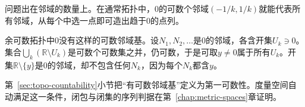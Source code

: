 问题出在邻域的数量上。在通常拓扑中，$0$的可数个邻域$(-1/k,1/k)$就能代表所有邻域，从每个中选一点即可造出趋于$0$的点列。

余可数拓扑中$0$没有这样的可数邻域基。设$N_1,N_2,\dots$是$0$的邻域，各含开集$U_k\ni0$。集合$\bigcup_k(\mathbb R\setminus U_k)$是可数个可数集之并，仍可数，于是可取$y\neq0$属于所有$U_k$。开集$\mathbb R\setminus\{y\}$是$0$的邻域，却不包含任何$N_k$，因为每个$N_k$都含$y$。

第~\ref{sec:topo-countability}小节把“有可数邻域基”定义为第一可数性。度量空间自动满足这一条件，闭包与闭集的序列判据在第~\ref{chap:metric-spaces}章证明。

